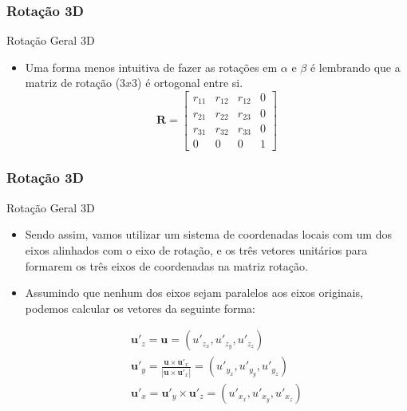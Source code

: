 \documentclass{beamer}
\begin{document}
\begin{frame}
\frametitle{Rotação 3D}


	\begin{block}{Rotação Geral 3D}
		\begin{itemize}
			\item Uma forma menos intuitiva de fazer as rotações em $\alpha$ e $\beta$ é lembrando que a matriz de rotação ($3x3$) é ortogonal entre si. \\
			
			\begin{equation*}
				\textbf{R} = \begin{bmatrix}
					r_{11}	& r_{12}		& r_{12} & 0 \\
					r_{21}	& r_{22}		& r_{23} & 0 \\
					r_{31}	& r_{32}		& r_{33} & 0 \\
					0			& 0				& 0	& 1
				\end{bmatrix}
			\end{equation*}
			
		\end{itemize}
	\end{block}
	
\end{frame}

\begin{frame}
\frametitle{Rotação 3D}


	\begin{block}{Rotação Geral 3D}
		\begin{itemize}
			\item Sendo assim, vamos utilizar um sistema de coordenadas locais com um dos eixos alinhados com o eixo de rotação, e os três vetores unitários para formarem os três eixos de coordenadas na matriz rotação.
			\item Assumindo que nenhum dos eixos sejam paralelos aos eixos originais, podemos calcular os vetores da seguinte forma:
			
			\begin{eqnarray*}
				\textbf{u}'_z = \textbf{u} = (u'_{z_x},u'_{z_y},u'_{z_z}) \\
				\textbf{u}'_y = \frac{\textbf{u} \times \textbf{u}'_x}{|\textbf{u} \times \textbf{u}'_x|} = (u'_{y_x},u'_{y_y},u'_{y_z}) \\
				\textbf{u}'_x = \textbf{u}'_y \times \textbf{u}'_z = (u'_{x_x},u'_{x_y},u'_{x_z}) \\
			\end{eqnarray*}
			
			 
		\end{itemize}
	\end{block}

\end{frame}
\end{document}
